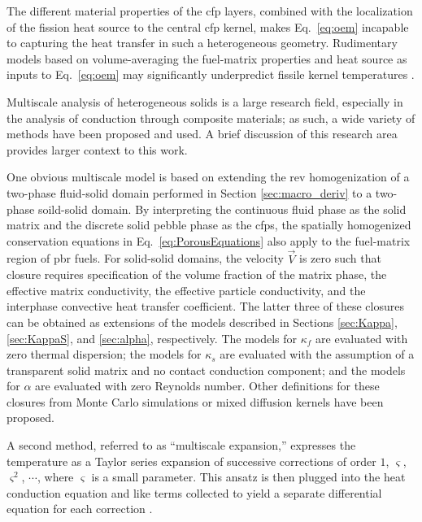 The different material properties of the \gls{cfp} layers, combined with the localization of the fission heat source to the central \gls{cfp} kernel, makes Eq.\ \eqref{eq:oem} incapable to capturing the heat transfer in such a heterogeneous geometry. Rudimentary models based on volume-averaging the fuel-matrix properties and heat source as inputs to Eq.\ \eqref{eq:oem} may significantly underpredict fissile kernel temperatures \cite{brown_fcm,kamalpour, novak_2019}.

Multiscale analysis of heterogeneous solids is a large research field, especially in the analysis of conduction through composite materials; as such, a wide variety of methods have been proposed and used. A brief discussion of this research area provides larger context to this work. 

One obvious multiscale model is based on extending the \gls{rev} homogenization of a two-phase fluid-solid domain performed in Section \ref{sec:macro_deriv} to a two-phase soild-solid domain. By interpreting the continuous fluid phase as the solid matrix and the discrete solid pebble phase as the \glspl{cfp}, the spatially homogenized conservation equations in Eq.\ \eqref{eq:PorousEquations} also apply to the fuel-matrix region of \gls{pbr} fuels. For solid-solid domains, the velocity \(\vec{V}\) is zero such that closure requires specification of the volume fraction of the matrix phase, the effective matrix conductivity, the effective particle conductivity, and the interphase convective heat transfer coefficient. The latter three of these closures can be obtained as extensions of the models described in Sections \ref{sec:Kappa}, \ref{sec:KappaS}, and \ref{sec:alpha}, respectively. The models for \(\kappa_f\) are evaluated with zero thermal dispersion; the models for \(\kappa_s\) are evaluated with the assumption of a transparent solid matrix and no contact conduction component; and the models for \(\alpha\) are evaluated with zero Reynolds number. Other definitions for these closures from Monte Carlo simulations \cite{cho} or mixed diffusion kernels \cite{espinosa} have been proposed. 

A second method, referred to as ``multiscale expansion,'' expresses the temperature as a Taylor series expansion of successive corrections of order \(1\), \(\varsigma\), \(\varsigma^2\), \(\cdots\), where \(\varsigma\) is a small parameter. This ansatz is then plugged into the heat conduction equation and like terms collected to yield a separate differential equation for each correction \cite{weinan}. 

